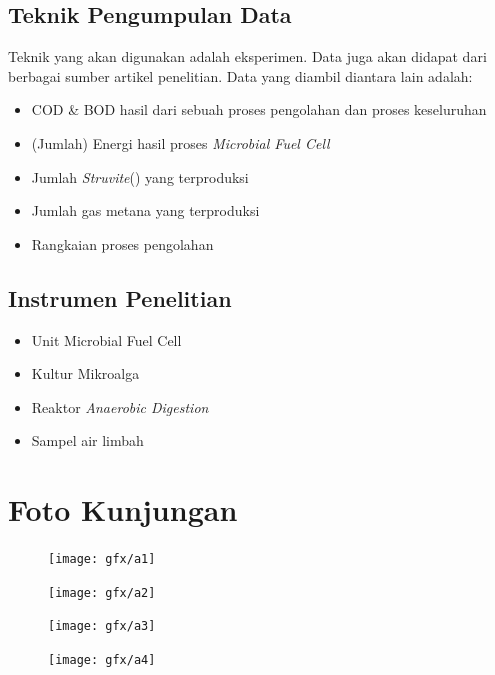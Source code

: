 \documentclass[10pt,a4paper,hidelinks]{article}
\begin{document}
    \subsection{Teknik Pengumpulan Data}
    Teknik yang akan digunakan adalah eksperimen. Data juga akan didapat dari berbagai sumber artikel penelitian. Data yang diambil diantara lain adalah:
    \begin{itemize}
    \item COD \& BOD hasil dari sebuah proses pengolahan dan proses keseluruhan
    \item (Jumlah) Energi hasil proses \textit{Microbial Fuel Cell}
    \item Jumlah \textit{Struvite}() yang terproduksi
    \item Jumlah gas metana yang terproduksi
    \item Rangkaian proses pengolahan
    \end{itemize}
    \subsection{Instrumen Penelitian}
    \begin{itemize}
    \item Unit Microbial Fuel Cell
    \item Kultur Mikroalga
    \item Reaktor \textit{Anaerobic Digestion}
    \item Sampel air limbah
    \end{itemize}
    \section{Foto Kunjungan}
    \begin{figure}[!ht]
	  \centering
		  \texttt{[image: gfx/a1]}
	\end{figure}
    \begin{figure}[!ht]
	  \centering
		  \texttt{[image: gfx/a2]}
	\end{figure}	
    \begin{figure}[!ht]
	  \centering
		  \texttt{[image: gfx/a3]}
	\end{figure}    \begin{figure}[!ht]
	  \centering
		  \texttt{[image: gfx/a4]}
	\end{figure}	
    \nocite{*}
    
    
\end{document}
